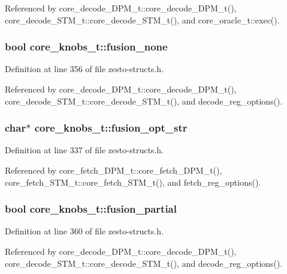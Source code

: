Referenced by core\_\-decode\_\-DPM\_\-t::core\_\-decode\_\-DPM\_\-t(), core\_\-decode\_\-STM\_\-t::core\_\-decode\_\-STM\_\-t(), and core\_\-oracle\_\-t::exec().
\subsubsection[{fusion\_\-none}]{\setlength{\rightskip}{0pt plus 5cm}bool {\bf core\_\-knobs\_\-t::fusion\_\-none}}\label{structcore__knobs__t_6d97a53a6a5b595734feb401915da722}




Definition at line 356 of file zesto-structs.h.

Referenced by core\_\-decode\_\-DPM\_\-t::core\_\-decode\_\-DPM\_\-t(), core\_\-decode\_\-STM\_\-t::core\_\-decode\_\-STM\_\-t(), and decode\_\-reg\_\-options().
\subsubsection[{fusion\_\-opt\_\-str}]{\setlength{\rightskip}{0pt plus 5cm}char$\ast$ {\bf core\_\-knobs\_\-t::fusion\_\-opt\_\-str}}\label{structcore__knobs__t_107abf3233bd2a0e0fe247a7e063783b}




Definition at line 337 of file zesto-structs.h.

Referenced by core\_\-fetch\_\-DPM\_\-t::core\_\-fetch\_\-DPM\_\-t(), core\_\-fetch\_\-STM\_\-t::core\_\-fetch\_\-STM\_\-t(), and fetch\_\-reg\_\-options().
\subsubsection[{fusion\_\-partial}]{\setlength{\rightskip}{0pt plus 5cm}bool {\bf core\_\-knobs\_\-t::fusion\_\-partial}}\label{structcore__knobs__t_3ad1ed319dddeafafc426c96b8f351a0}




Definition at line 360 of file zesto-structs.h.

Referenced by core\_\-decode\_\-DPM\_\-t::core\_\-decode\_\-DPM\_\-t(), core\_\-decode\_\-STM\_\-t::core\_\-decode\_\-STM\_\-t(), and decode\_\-reg\_\-options().
